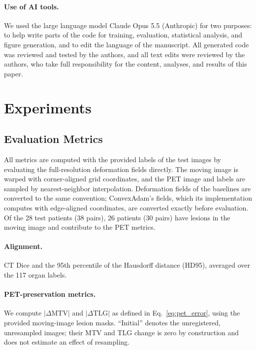 \paragraph{Use of AI tools.}
We used the large language model Claude Opus 5.5 (Anthropic) for two purposes: to help write parts of the code for training, evaluation, statistical analysis, and figure generation, and to edit the language of the manuscript.
All generated code was reviewed and tested by the authors, and all text edits were reviewed by the authors, who take full responsibility for the content, analyses, and results of this paper.

\section{Experiments}
\label{sect:experiments}

\subsection{Evaluation Metrics}
\label{sect:metrics}

All metrics are computed with the provided labels of the test images by evaluating the full-resolution deformation fields directly.
The moving image is warped with corner-aligned grid coordinates, and the PET image and labels are sampled by nearest-neighbor interpolation.
Deformation fields of the baselines are converted to the same convention; ConvexAdam's fields, which its implementation computes with edge-aligned coordinates, are converted exactly before evaluation.
Of the 28 test patients (38 pairs), 26 patients (30 pairs) have lesions in the moving image and contribute to the PET metrics.

\paragraph{Alignment.}
CT Dice and the 95th percentile of the Hausdorff distance (HD95), averaged over the 117 organ labels.

\paragraph{PET-preservation metrics.}
We compute $|\Delta\mathrm{MTV}|$ and $|\Delta\mathrm{TLG}|$ as defined in Eq.~\eqref{eq:pet_error}, using the provided moving-image lesion masks.
``Initial'' denotes the unregistered, unresampled images; their MTV and TLG change is zero by construction and does not estimate an effect of resampling.

